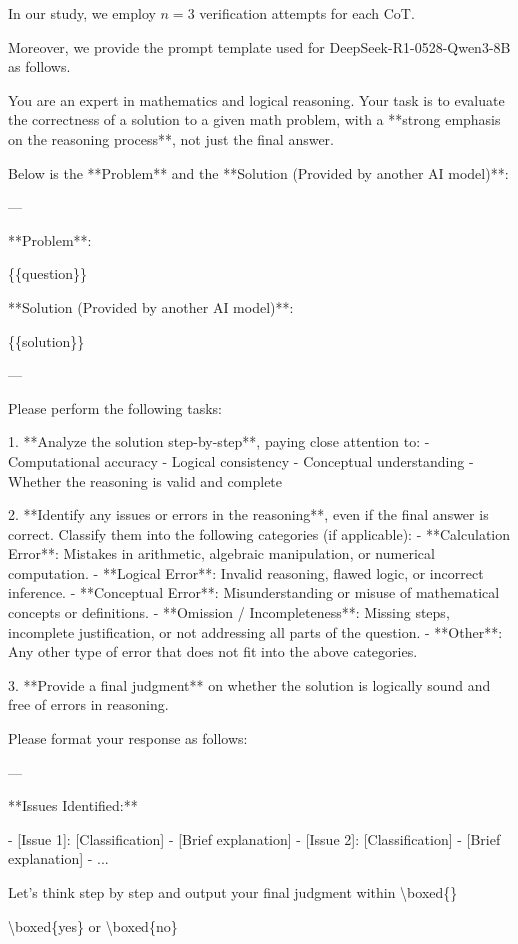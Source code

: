 In our study, we employ $n = 3$ verification attempts for each CoT.

Moreover, we provide the prompt template used for DeepSeek-R1-0528-Qwen3-8B as follows.

\begin{tcolorbox}[title=Our Prompt Template for Verifier DeepSeek-R1-0528-Qwen3-8B]

You are an expert in mathematics and logical reasoning. Your task is to evaluate the correctness of a solution to a given math problem, with a **strong emphasis on the reasoning process**, not just the final answer.

Below is the **Problem** and the **Solution (Provided by another AI model)**:

---

**Problem**:

\{\{question\}\}

**Solution (Provided by another AI model)**:

\{\{solution\}\}

---

Please perform the following tasks:

1. **Analyze the solution step-by-step**, paying close attention to:
   - Computational accuracy
   - Logical consistency
   - Conceptual understanding
   - Whether the reasoning is valid and complete

2. **Identify any issues or errors in the reasoning**, even if the final answer is correct. Classify them into the following categories (if applicable):
   - **Calculation Error**: Mistakes in arithmetic, algebraic manipulation, or numerical computation.
   - **Logical Error**: Invalid reasoning, flawed logic, or incorrect inference.
   - **Conceptual Error**: Misunderstanding or misuse of mathematical concepts or definitions.
   - **Omission / Incompleteness**: Missing steps, incomplete justification, or not addressing all parts of the question.
   - **Other**: Any other type of error that does not fit into the above categories.

3. **Provide a final judgment** on whether the solution is logically sound and free of errors in reasoning.

Please format your response as follows:

---

**Issues Identified:**

- [Issue 1]: [Classification] - [Brief explanation]
- [Issue 2]: [Classification] - [Brief explanation]
- ...

Let's think step by step and output your final judgment within \textbackslash boxed\{\}

\textbackslash boxed\{yes\} or \textbackslash boxed\{no\}

\end{tcolorbox}

